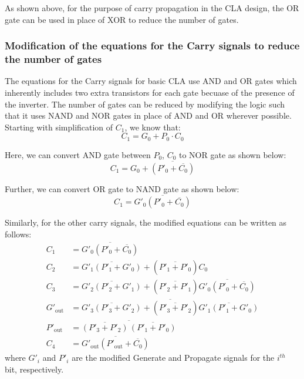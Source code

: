 \documentclass[conference]{IEEEtran}
\begin{document}
\noindent As shown above, for the purpose of carry propagation in the CLA design, the OR gate can be used in place of XOR to reduce the number of gates.\\

\subsubsection{Modification of the equations for the Carry signals to reduce the number of gates}

The equations for the Carry signals for basic CLA use AND and OR gates which inherently includes two extra transistors for each gate becuase of the presence of the inverter. The number of gates can be reduced by modifying the logic such that it uses NAND and NOR gates in place of AND and OR wherever possible. Starting with simplification of $C_1$, we know that:
\[
    C_1 = G_0 + P_0 \cdot C_0
\]

Here, we can convert AND gate between $P_0$, $C_0$ to NOR gate as shown below:
\[
    C_1 = G_0 + \overline{\left(P'_0 + \overline{C_0}\right)} 
\]

Further, we can convert OR gate to NAND gate as shown below:
\[
    C_1 = \overline{G'_0 \left(P'_0 + \overline{C_0}\right)}
\]

\noindent
Similarly, for the other carry signals, the modified equations can be written as follows:
\begin{align}
    C_1 &= \overline{G'_0 \left(P'_0 + \overline{C_0}\right)} \label{eq:c1}\\
    C_2 &= \overline{G'_1 \left(P'_1 + G'_0\right)} + \left(\overline{P'_1 + P'_0}\right)C_0 \label{eq:c2} \\
    C_3 &= \overline{G'_2 \left(P'_2 + G'_1\right)} + \left(\overline{P'_2 + P'_1}\right)\overline{G'_0 \left(P'_0 + \overline{C_0}\right)} \label{eq:c3} \\
    G'_{\text{out}} &= \overline{\overline{G'_3 \left(P'_3 + G'_2\right)} + \left(\overline{P'_3 + P'_2}\right)\overline{G'_1 \left(P'_1 + G'_0\right)}} \label{eq:gout} \\
    P'_{\text{out}} &= \overline{\overline{\left(P'_3 + P'_2\right)} \, \overline{\left(P'_1 + P'_0\right)}} \label{eq:pout} \\
    C_4 &= \overline{G'_{\text{out}} \left(P'_{\text{out}} + \overline{C_0}\right)} \label{eq:c4}
\end{align}
where $G'_i$ and $P'_i$ are the modified Generate and Propagate signals for the $i^{th}$ bit, respectively.
\end{document}
